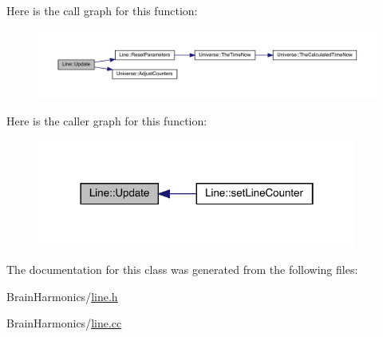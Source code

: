 Here is the call graph for this function\+:
\nopagebreak
\begin{figure}[H]
\begin{center}
\leavevmode
\includegraphics[width=350pt]{class_line_a8c6dece66f5cd93ce40134002a40f505_cgraph}
\end{center}
\end{figure}
Here is the caller graph for this function\+:
\nopagebreak
\begin{figure}[H]
\begin{center}
\leavevmode
\includegraphics[width=298pt]{class_line_a8c6dece66f5cd93ce40134002a40f505_icgraph}
\end{center}
\end{figure}


The documentation for this class was generated from the following files\+:\begin{DoxyCompactItemize}
\item 
Brain\+Harmonics/\hyperlink{line_8h}{line.\+h}\item 
Brain\+Harmonics/\hyperlink{line_8cc}{line.\+cc}\end{DoxyCompactItemize}
